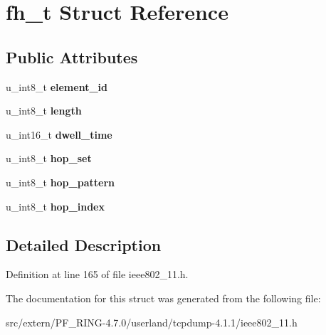 \hypertarget{structfh__t}{
\section{fh\_\-t Struct Reference}
\label{structfh__t}
}
\subsection*{Public Attributes}
\begin{DoxyCompactItemize}
\item 
\hypertarget{structfh__t_a8446beb4093bcc61dfb39dcfbe7d5bdc}{
u\_\-int8\_\-t {\bfseries element\_\-id}}
\label{structfh__t_a8446beb4093bcc61dfb39dcfbe7d5bdc}

\item 
\hypertarget{structfh__t_ab22bf51327e7a491799d4d71a859dbd1}{
u\_\-int8\_\-t {\bfseries length}}
\label{structfh__t_ab22bf51327e7a491799d4d71a859dbd1}

\item 
\hypertarget{structfh__t_a88d25172b8704d0dad6b9802134ad48e}{
u\_\-int16\_\-t {\bfseries dwell\_\-time}}
\label{structfh__t_a88d25172b8704d0dad6b9802134ad48e}

\item 
\hypertarget{structfh__t_a5473db8091c7d6b42a4a47d85ed757c8}{
u\_\-int8\_\-t {\bfseries hop\_\-set}}
\label{structfh__t_a5473db8091c7d6b42a4a47d85ed757c8}

\item 
\hypertarget{structfh__t_ab7945f4b549db1d9d0653c138d66f19d}{
u\_\-int8\_\-t {\bfseries hop\_\-pattern}}
\label{structfh__t_ab7945f4b549db1d9d0653c138d66f19d}

\item 
\hypertarget{structfh__t_a431cc37c66352c6ed925e4b22ecf31cf}{
u\_\-int8\_\-t {\bfseries hop\_\-index}}
\label{structfh__t_a431cc37c66352c6ed925e4b22ecf31cf}

\end{DoxyCompactItemize}


\subsection{Detailed Description}


Definition at line 165 of file ieee802\_\-11.h.



The documentation for this struct was generated from the following file:\begin{DoxyCompactItemize}
\item 
src/extern/PF\_\-RING-\/4.7.0/userland/tcpdump-\/4.1.1/ieee802\_\-11.h\end{DoxyCompactItemize}
